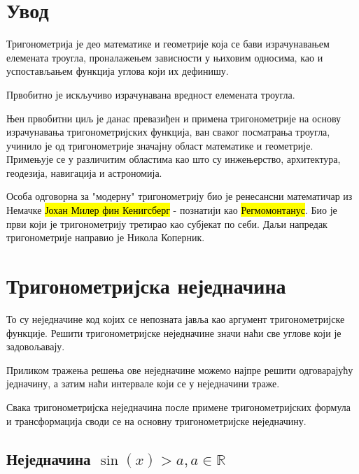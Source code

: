 \documentclass[a4paper,12pt]{article}
\author{Ema Spasić}
\begin{document}
\tableofcontents

\newpage
\setlength{\parindent}{2em}
\setlength{\parskip}{1em}


\hypertarget{Увод}{
\section{Увод}\label{Увод}}

Тригонометрија је део математике и геометрије која се бави израчунавањем
елемената троугла, проналажењем зависности у њиховим односима, као и
успостављањем функција углова који их дефинишу.

Првобитно је искључиво израчунавана вредност елемената троугла.

Њен првобитни циљ је данас превазиђен и примена тригонометрије на основу
израчунавања тригонометријских функција, ван сваког посматрања троугла,
учинило је од тригонометрије значајну област математике и геометрије.
Примењује се у различитим областима као што су инжењерство, архитектура,
геодезија, навигација и астрономија.

Особа одговорна за "модерну" тригонометрију био је ренесансни
математичар из Немачке \hl{Јохан Милер фин Кенигсберг} - познатији као
\hl{Регмомонтанус}. Био је први који је тригонометрију третирао као субјекат
по себи. Даљи напредак тригонометрије направио је Никола Коперник.

\newpage
\section{Тригонометријска неједначина}

То су неједначине код којих се непозната јавља као аргумент
тригонометријске функције. Решити тригонометријске неједначине значи
наћи све углове који је задовољавају.

Приликом тражења решења ове неједначине можемо најпре решити
одговарајућу једначину, а затим наћи интервале који се у неједначини
траже.

Свака тригонометријска неједначина после примене тригонометријских
формула и трансформација своди се на основну тригонометријске
неједначину.


\subsection{Неједначина $\sin(x)>a,a\in\mathbb{R}$}
\end{document}
